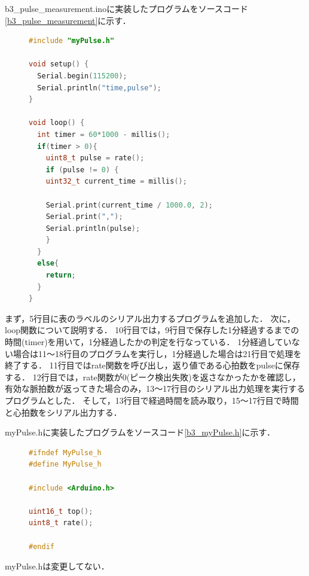 b3\_pulse\_measurement.inoに実装したプログラムをソースコード\ref{b3_pulse_measurement}に示す．
\begin{figure}[H]
    \begin{lstlisting}[caption=b3\_pulse\_measurement.ino, label=b3_pulse_measurement, escapechar=\@, language=c++]
#include "myPulse.h"

void setup() {
  Serial.begin(115200);
  Serial.println("time,pulse");
}

void loop() {
  int timer = 60*1000 - millis();
  if(timer > 0){
    uint8_t pulse = rate();
    if (pulse != 0) {
    uint32_t current_time = millis();

    Serial.print(current_time / 1000.0, 2);
    Serial.print(",");
    Serial.println(pulse);
    }
  }
  else{
    return;
  }
}
    \end{lstlisting}
\end{figure}

\newpage

まず，5行目に表のラベルのシリアル出力するプログラムを追加した．
次に，loop関数について説明する．
10行目では，9行目で保存した1分経過するまでの時間(timer)を用いて，1分経過したかの判定を行なっている．
1分経過していない場合は11〜18行目のプログラムを実行し，1分経過した場合は21行目で処理を終了する．
11行目ではrate関数を呼び出し，返り値である心拍数をpulseに保存する．
12行目では，rate関数が0(ピーク検出失敗)を返さなかったかを確認し，有効な脈拍数が返ってきた場合のみ，13〜17行目のシリアル出力処理を実行するプログラムとした．
そして，13行目で経過時間を読み取り，15〜17行目で時間と心拍数をシリアル出力する．

myPulse.hに実装したプログラムをソースコード\ref{b3_myPulse.h}に示す．
\begin{figure}[H]
    \begin{lstlisting}[caption=myPulse.h, label=b3_myPulse.h, escapechar=\@, language=c++]
#ifndef MyPulse_h
#define MyPulse_h

#include <Arduino.h>

uint16_t top();
uint8_t rate();

#endif
    \end{lstlisting}
\end{figure}
myPulse.hは変更してない．

\newpage

